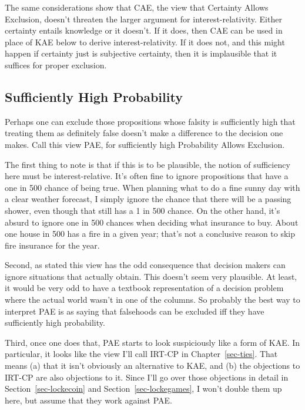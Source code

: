 \documentclass[
  10pt,
  letterpaper,
  twoside]{scrbook}
\begin{document}
The same considerations show that CAE, the view that Certainty Allows
Exclusion, doesn't threaten the larger argument for interest-relativity.
Either certainty entails knowledge or it doesn't. If it does, then CAE
can be used in place of KAE below to derive interest-relativity. If it
does not, and this might happen if certainty just is subjective
certainty, then it is implausible that it suffices for proper exclusion.

\subsection{Sufficiently High Probability}\label{sec-kae-high-prob}

Perhaps one can exclude those propositions whose falsity is sufficiently
high that treating them as definitely false doesn't make a difference to
the decision one makes. Call this view PAE, for sufficiently high
Probability Allows Exclusion.

The first thing to note is that if this is to be plausible, the notion
of sufficiency here must be interest-relative. It's often fine to ignore
propositions that have a one in 500 chance of being true. When planning
what to do a fine sunny day with a clear weather forecast, I simply
ignore the chance that there will be a passing shower, even though that
still has a 1 in 500 chance. On the other hand, it's absurd to ignore
one in 500 chances when deciding what insurance to buy. About one house
in 500 has a fire in a given year; that's not a conclusive reason to
skip fire insurance for the year.

Second, as stated this view has the odd consequence that decision makers
can ignore situations that actually obtain. This doesn't seem very
plausible. At least, it would be very odd to have a textbook
representation of a decision problem where the actual world wasn't in
one of the columns. So probably the best way to interpret PAE is as
saying that falsehoods can be excluded iff they have sufficiently high
probability.

Third, once one does that, PAE starts to look suspiciously like a form
of KAE. In particular, it looks like the view I'll call IRT-CP in
Chapter~\ref{sec-ties}. That means (a) that it isn't obviously an
alternative to KAE, and (b) the objections to IRT-CP are also objections
to it. Since I'll go over those objections in detail in
Section~\ref{sec-lockecoin} and Section~\ref{sec-lockegames}, I won't
double them up here, but assume that they work against PAE.
\end{document}
